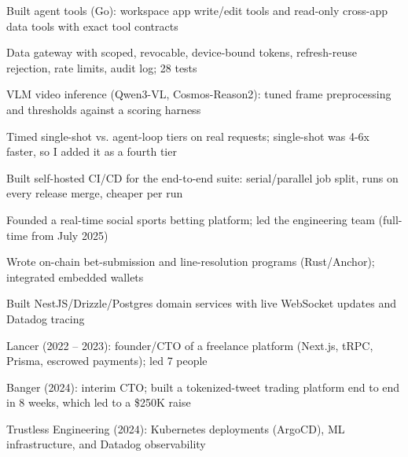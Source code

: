 \documentclass[print]{jack-resume}
\begin{document}
\begin{tightemize}
    \item Built agent tools (Go): workspace app write/edit tools and read-only cross-app data tools with exact tool contracts
    \item Data gateway with scoped, revocable, device-bound tokens, refresh-reuse rejection, rate limits, audit log; 28 tests
    \item VLM video inference (Qwen3-VL, Cosmos-Reason2): tuned frame preprocessing and thresholds against a scoring harness
    \item Timed single-shot vs. agent-loop tiers on real requests; single-shot was 4-6x faster, so I added it as a fourth tier
    \item Built self-hosted CI/CD for the end-to-end suite: serial/parallel job split, runs on every release merge, cheaper per run
\end{tightemize}
\sectionsep

\begin{tightemize}
    \item Founded a real-time social sports betting platform; led the engineering team (full-time from July 2025)
    \item Wrote on-chain bet-submission and line-resolution programs (Rust/Anchor); integrated embedded wallets
    \item Built NestJS/Drizzle/Postgres domain services with live WebSocket updates and Datadog tracing
\end{tightemize}
\sectionsep

\begin{tightemize}
    \item Lancer (2022 -- 2023): founder/CTO of a freelance platform (Next.js, tRPC, Prisma, escrowed payments); led 7 people
    \item Banger (2024): interim CTO; built a tokenized-tweet trading platform end to end in 8 weeks, which led to a \$250K raise
    \item Trustless Engineering (2024): Kubernetes deployments (ArgoCD), ML infrastructure, and Datadog observability
\end{tightemize}
\sectionsep
\end{document}
